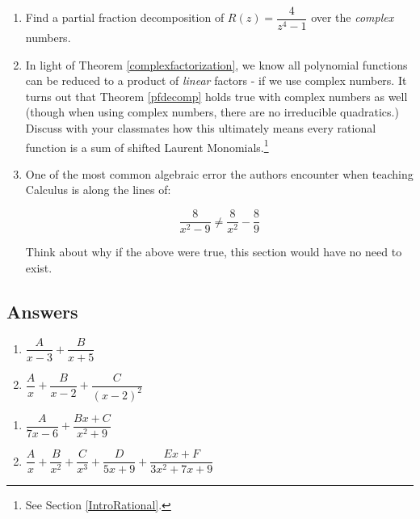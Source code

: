 \documentclass{ximera}
\begin{document}
\begin{enumerate}
\setcounter{enumi}{\value{HW}}

\item  Find a partial fraction decomposition of $R(z) = \dfrac{4}{z^4-1}$ over the \textit{complex} numbers.  

\item  In light of Theorem \ref{complexfactorization}, we know all polynomial functions can be reduced to a product of \textit{linear} factors - if we use complex numbers.  It turns out that Theorem \ref{pfdecomp} holds true with complex numbers as well (though when using complex numbers, there are no irreducible quadratics.)  Discuss with your classmates how this ultimately means every rational function is a sum of shifted Laurent Monomials.\footnote{See Section \ref{IntroRational}.}

\item  One of the most common algebraic error the authors encounter when teaching  Calculus is along the lines of:

\[ \dfrac{8}{x^2 - 9} \neq \dfrac{8}{x^2} - \dfrac{8}{9}\]

Think about  why if the above were true, this section would have no need to exist.

\end{enumerate}

\newpage

\subsection{Answers}

\begin{multicols}{2}
\begin{enumerate}

\item $\dfrac{A}{x - 3} + \dfrac{B}{x + 5}$
\item $\dfrac{A}{x} + \dfrac{B}{x - 2} + \dfrac{C}{(x - 2)^{2}}$

\setcounter{HW}{\value{enumi}}
\end{enumerate}
\end{multicols}

\begin{multicols}{2}
\begin{enumerate}
\setcounter{enumi}{\value{HW}}

\item $\dfrac{A}{7x - 6} + \dfrac{Bx + C}{x^{2} + 9}$
\item $\dfrac{A}{x} + \dfrac{B}{x^{2}} + \dfrac{C}{x^{3}} + \dfrac{D}{5x + 9} + \dfrac{Ex + F}{3x^{2} + 7x + 9}$

\setcounter{HW}{\value{enumi}}
\end{enumerate}
\end{multicols}
\end{document}
